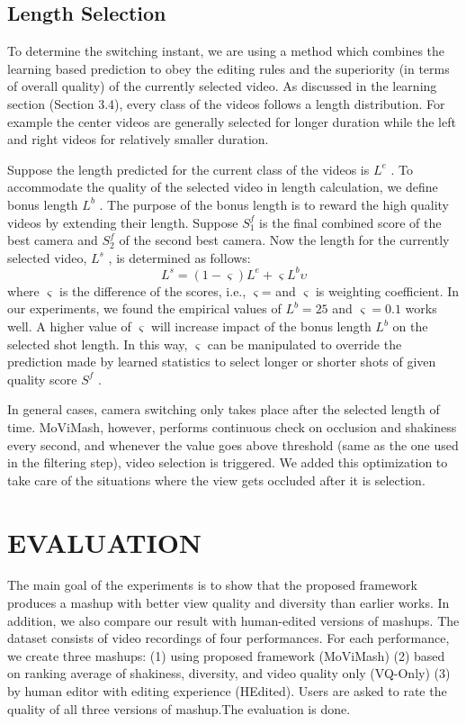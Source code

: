 \documentclass{sig-alternate-05-2015}
\begin{document}
\subsection{Length Selection}
To determine the switching instant, we are using a method which
combines the learning based prediction to obey the editing rules and
the superiority (in terms of overall quality) of the currently selected
video. As discussed in the learning section (Section 3.4), every
class of the videos follows a length distribution. For example the
center videos are generally selected for longer duration while the
left and right videos for relatively smaller duration.

Suppose the length predicted for the current class of the videos
is $L^e$ . To accommodate the quality of the selected video in length
calculation, we define bonus length $L^b$ . The purpose of the bonus
length is to reward the high quality videos by extending their length.
Suppose $S_1^f$ is the final combined score of the best camera and $S_2^f$
of the second best camera. Now the length for the currently selected
video, $L^s$ , is determined as follows:
\begin{equation}
L^s=(1 -\varsigma )L^e + \varsigma L^b\upsilon
\end{equation}
where $\varsigma$ is the difference of the scores, i.e., $\varsigma $=
and $\varsigma$ is
weighting coefficient. In our experiments, we found the empirical
values of $L^b = 25$ and $\varsigma = 0.1$ works well. A higher value of
$\varsigma$ will increase impact of the bonus length $L^b$ on the selected shot
length. In this way, $\varsigma $ can be manipulated to override the prediction
made by learned statistics to select longer or shorter shots of given
quality score $S^f$ .


In general cases, camera switching only takes place after the selected length of time. MoViMash, however, performs continuous
check on occlusion and shakiness every second, and whenever the
value goes above threshold (same as the one used in the filtering
step), video selection is triggered. We added this optimization to
take care of the situations where the view gets occluded after it is
selection. 

\section{EVALUATION}
The main goal of the experiments is to show that the proposed
framework produces a mashup with better view quality and diversity than earlier works. In addition, we also compare our result with
human-edited versions of mashups. The dataset consists of video
recordings of four performances. For each performance, we create three mashups: (1) using proposed framework (MoViMash) (2)
based on ranking average of shakiness, diversity, and video quality only (VQ-Only) (3) by human editor with editing experience (HEdited). Users are asked to rate the quality of all three versions of
mashup.The evaluation is done.
\end{document}

